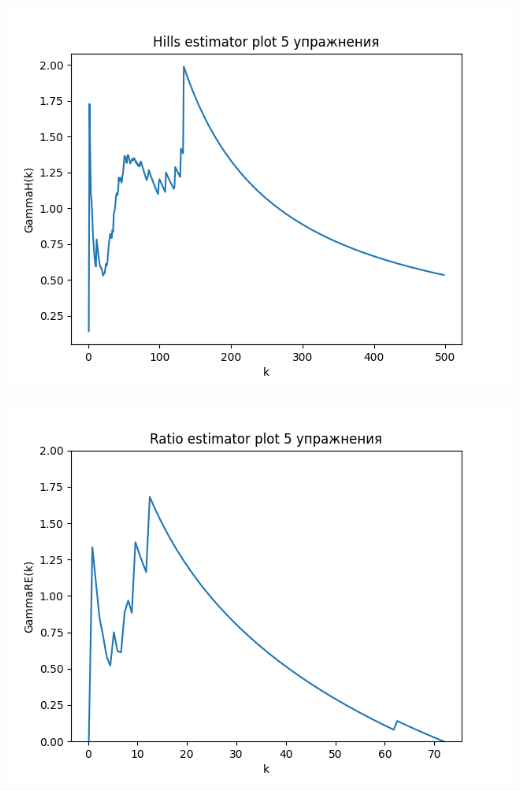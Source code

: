 \documentclass[reprint, amsmath, amssymb, aps,]{revtex4-2}
\begin{document}
\begin{center}
\centering 
\includegraphics[scale=0.6]{Exercise51.png}
\end{center}

\begin{center}
\centering 
\includegraphics[scale=0.6]{Exercise52.png}
\end{center}
\end{document}
